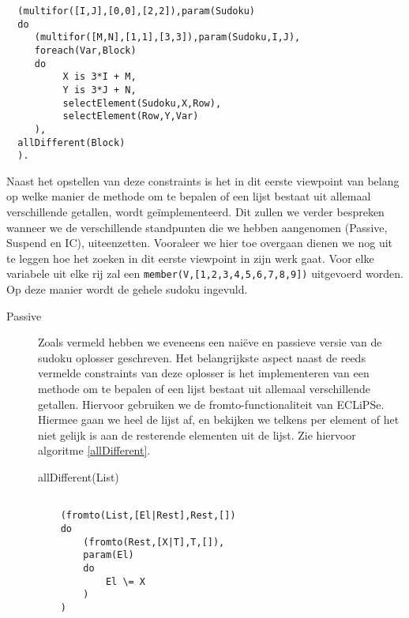 \begin{description}
\begin{algorithm}
\begin{verbatim}
  (multifor([I,J],[0,0],[2,2]),param(Sudoku)
  do
     (multifor([M,N],[1,1],[3,3]),param(Sudoku,I,J),
     foreach(Var,Block)
     do
          X is 3*I + M,
          Y is 3*J + N,
          selectElement(Sudoku,X,Row),
          selectElement(Row,Y,Var)
     ),
  allDifferent(Block)
  ).
\end{verbatim}
\end{algorithm}
Naast het opstellen van deze constraints is het in dit eerste viewpoint van belang op welke manier
de methode om te bepalen of een lijst bestaat uit allemaal verschillende getallen, wordt ge\"implementeerd.
Dit zullen we verder bespreken wanneer we de verschillende standpunten 
die we hebben aangenomen (Passive, Suspend en IC), uiteenzetten. Vooraleer we hier toe overgaan 
dienen we nog uit te leggen hoe het zoeken in dit eerste viewpoint in zijn werk gaat. Voor elke variabele
uit elke rij zal een \verb|member(V,[1,2,3,4,5,6,7,8,9])| uitgevoerd worden. Op deze manier wordt de gehele
sudoku ingevuld.
        \begin{description}
         \item[Passive] Zoals vermeld hebben we eveneens een nai\"eve en passieve versie van de sudoku oplosser geschreven.
                Het belangrijkste aspect naast de reeds vermelde constraints van deze oplosser is het implementeren van een methode om te bepalen of een 
                lijst bestaat uit allemaal verschillende getallen. Hiervoor gebruiken we de fromto-functionaliteit
                van ECLiPSe. Hiermee gaan we heel de lijst af, en bekijken we telkens per element of het niet gelijk is
                aan de resterende elementen uit de lijst. Zie hiervoor algoritme \ref{allDifferent}.

\begin{algorithm}
\caption{allDifferent(List)}
\label{allDifferent}
\begin{verbatim}

    (fromto(List,[El|Rest],Rest,[])
    do
        (fromto(Rest,[X|T],T,[]),
        param(El)
        do
            El \= X
        )
    )
\end{verbatim}
\end{algorithm}


\end{description}
\end{description}
